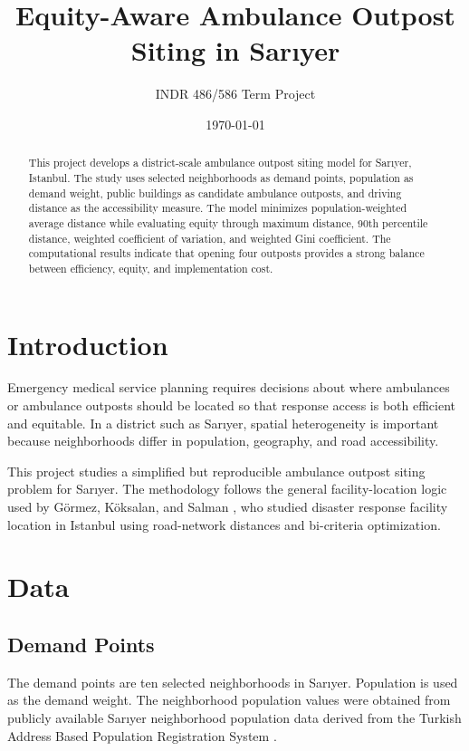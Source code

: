 \documentclass[11pt,a4paper]{article}
\title{Equity-Aware Ambulance Outpost Siting in Sar{\i}yer}
\author{INDR 486/586 Term Project}
\date{\today}
\begin{document}
\maketitle

\begin{abstract}
This project develops a district-scale ambulance outpost siting model for Sar{\i}yer, Istanbul.
The study uses selected neighborhoods as demand points, population as demand weight, public buildings as candidate ambulance outposts, and driving distance as the accessibility measure.
The model minimizes population-weighted average distance while evaluating equity through maximum distance, 90th percentile distance, weighted coefficient of variation, and weighted Gini coefficient.
The computational results indicate that opening four outposts provides a strong balance between efficiency, equity, and implementation cost.
\end{abstract}

\section{Introduction}

Emergency medical service planning requires decisions about where ambulances or ambulance outposts should be located so that response access is both efficient and equitable.
In a district such as Sar{\i}yer, spatial heterogeneity is important because neighborhoods differ in population, geography, and road accessibility.

This project studies a simplified but reproducible ambulance outpost siting problem for Sar{\i}yer.
The methodology follows the general facility-location logic used by G{\"o}rmez, K{\"o}ksalan, and Salman \cite{gormez2011}, who studied disaster response facility location in Istanbul using road-network distances and bi-criteria optimization.

\section{Data}

\subsection{Demand Points}

The demand points are ten selected neighborhoods in Sar{\i}yer.
Population is used as the demand weight.
The neighborhood population values were obtained from publicly available Sar{\i}yer neighborhood population data derived from the Turkish Address Based Population Registration System \cite{nufusu_sariyer,tuik_adnks}.
\end{document}
